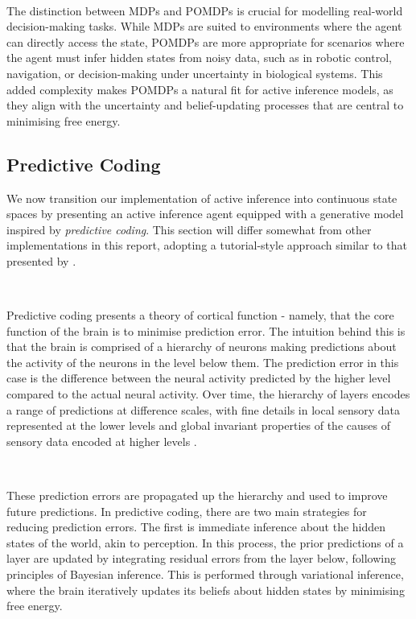 \documentclass{article}
\begin{document}
\

The distinction between MDPs and POMDPs is crucial for modelling real-world decision-making tasks. While MDPs are suited to environments where the agent can directly access the state, POMDPs are more appropriate for scenarios where the agent must infer hidden states from noisy data, such as in robotic control, navigation, or decision-making under uncertainty in biological systems. This added complexity makes POMDPs a natural fit for active inference models, as they align with the uncertainty and belief-updating processes that are central to minimising free energy.

\subsection{Predictive Coding}\label{section:predictive_coding}

We now transition our implementation of active inference into continuous state spaces by presenting an active inference agent equipped with a generative model inspired by \textit{predictive coding}. This section will differ somewhat from other implementations in this report, adopting a tutorial-style approach similar to that presented by \citet{bogacz2017tutorial}.

\

Predictive coding presents a theory of cortical function - namely, that the core function of the brain is to minimise prediction error. The intuition behind this is that the brain is comprised of a hierarchy of neurons making predictions about the activity of the neurons in the level below them. \citep{friston2008hierarchical} The prediction error in this case is the difference between the neural activity predicted by the higher level compared to the actual neural activity. Over time, the hierarchy of layers encodes a range of predictions at difference scales, with fine details in local sensory data represented at the lower levels and global invariant properties of the causes of sensory data encoded at higher levels \citep{millidge2021applications}. 

\

These prediction errors are propagated up the hierarchy and used to improve future predictions. In predictive coding, there are two main strategies for reducing prediction errors. The first is immediate inference about the hidden states of the world, akin to perception. In this process, the prior predictions of a layer are updated by integrating residual errors from the layer below, following principles of Bayesian inference. This is performed through variational inference, where the brain iteratively updates its beliefs about hidden states by minimising free energy.
\end{document}
